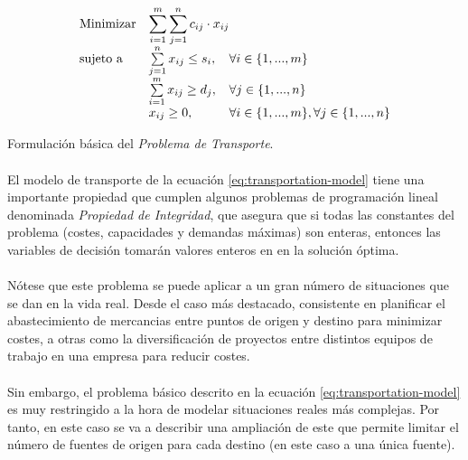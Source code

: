 \documentclass[a4paper, spanish]{article}
\begin{document}
    \begin{eqfloat}
      \begin{equation}
        \begin{array}{ll@{}ll}
          \text{Minimizar}	& \displaystyle \sum\limits_{i=1}^{m}\sum\limits_{j=1}^{n}c_{ij} \cdot x_{ij} \\
          \text{sujeto a}		& \sum\limits_{j=1}^{n} x_{ij}	\leq s_{i}, & \forall i \in \{1,...,m\}\\
                            &	\sum\limits_{i=1}^{m} x_{ij}	\geq d_{j}, & \forall j \in \{1,...,n\} \\
                            & x_{ij}	\geq 0, 	& \forall i \in \{1,...,m\}, \forall j \in \{1,...,n\}
        \end{array}
      \end{equation}
      \caption{Formulación básica del \emph{Problema de Transporte}.}
      \label{eq:transportation-model}
    \end{eqfloat}

    \paragraph{}
    El modelo de transporte de la ecuación \eqref{eq:transportation-model} tiene una importante propiedad que cumplen algunos problemas de programación lineal denominada \emph{Propiedad de Integridad}, que asegura que si todas las constantes del problema (costes, capacidades y demandas máximas) son enteras, entonces las variables de decisión tomarán valores enteros en en la solución óptima.

    \paragraph{}
    Nótese que este problema se puede aplicar a un gran número de situaciones que se dan en la vida real. Desde el caso más destacado, consistente en planificar el abastecimiento de mercancias entre puntos de origen y destino para minimizar costes, a otras como la diversificación de proyectos entre distintos equipos de trabajo en una empresa para reducir costes.

    \paragraph{}
    Sin embargo, el problema básico descrito en la ecuación \eqref{eq:transportation-model} es muy restringido a la hora de modelar situaciones reales más complejas. Por tanto, en este caso se va a describir una ampliación de este que permite limitar el número de fuentes de origen para cada destino (en este caso a una única fuente).
\end{document}
